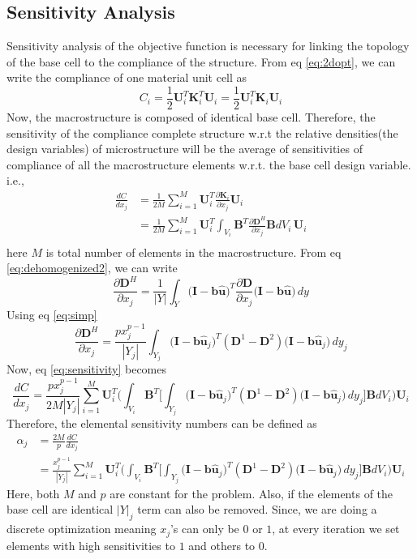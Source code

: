 \documentclass[10pt]{article}
\newcommand{\e}[1]{\textbf{#1}}
\newcommand{\fj}[2]{\frac{\partial #1}{\partial #2}}
\begin{document}
\subsection{Sensitivity Analysis}
Sensitivity analysis of the objective function is necessary for linking the topology of the base cell to the compliance of the structure. From eq \eqref{eq:2dopt}, we can write the compliance of one material unit cell as 
\begin{equation}
C_i = \frac{1}{2}\e U_i^T\e K_i^T\e U_i = \frac{1}{2}\e U_i^T\e K_i\e U_i
\end{equation}
Now, the macrostructure is composed of identical base cell. Therefore, the sensitivity of the compliance complete structure w.r.t the relative densities(the design variables) of microstructure will be the average of sensitivities of compliance of all the macrostructure elements w.r.t. the base cell design variable. i.e.,
\begin{equation}
\label{eq:sensitivity}
\begin{split}
\frac{dC}{dx_j} &= \frac{1}{2M}\sum_{i=1}^M\e U_i^T\fj{\e K_i}{x_j}\e U_i\\
&= \frac{1}{2M}\sum_{i=1}^M\e U_i^T\int_{V_i} \textbf{B}^T\fj{\e D^H}{x_j}\textbf{B} dV_i\,\e U_i\\
\end{split}
\end{equation}
here $M$ is total number of elements in the macrostructure. From eq \eqref{eq:dehomogenized2}, we can write
\begin{equation}
\fj{\e D^H}{x_j} = \frac{1}{|Y|}\int_Y\big (\e I-\textbf{b}\hat{\e u}\big)^T\fj{\e D}{x_j}\big (\e I-\textbf{b}\hat{\e u}\big)\,dy
\end{equation}
Using eq \eqref{eq:simp}
\begin{equation}
\fj{\e D^H}{x_j} = \frac{px^{p-1}_j}{|Y_j|}\int_{Y_j}\big (\e I-\e b\hat{\e u}_j\big)^T(\e D^1 - \e D^2)\big (\e I-\textbf{b}\hat{\e u}_j\big)\,dy_j
\end{equation}
Now, eq \eqref{eq:sensitivity} becomes
\begin{equation}
\label{eq:sensitivity1}
\frac{dC}{dx_j} = \frac{px^{p-1}_j}{2M|Y_j|}\sum_{i=1}^M\e U_i^T\bigg (\int_{V_i} \textbf{B}^T\bigg[\int_{Y_j}\big (\e I-\e b\hat{\e u}_j\big)^T(\e D^1 - \e D^2)\big (\e I-\textbf{b}\hat{\e u}_j\big)\,dy_j\bigg]\textbf{B} dV_i\bigg )\e U_i
\end{equation}
Therefore, the elemental sensitivity numbers can be defined as
\begin{equation}
\begin{split}
\alpha_j &= \frac{2M}{p}\frac{dC}{dx_j}\\
&=\frac{x^{p-1}_j}{|Y_j|}\sum_{i=1}^M\e U_i^T\bigg (\int_{V_i} \textbf{B}^T\bigg[\int_{Y_j}\big (\e I-\e b\hat{\e u}_j\big)^T(\e D^1 - \e D^2)\big (\e I-\textbf{b}\hat{\e u}_j\big)\,dy_j\bigg]\textbf{B} dV_i\bigg )\e U_i
\end{split}
\end{equation}
Here, both $M$ and $p$ are constant for the problem. Also, if the elements of the base cell are identical $|Y|_j$ term can also be removed. Since, we are doing a discrete optimization meaning $x_j$'s can only be $0$ or $1$, at every iteration we set elements with high sensitivities to $1$ and others to $0$.
\end{document}
